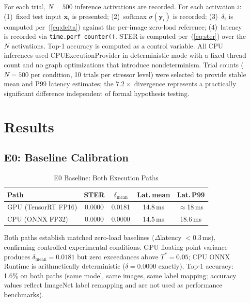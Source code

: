 \documentclass[journal,10pt,twocolumn]{IEEEtran}
\begin{document}
For each trial, $N = 500$ inference activations are recorded.
For each activation $i$: (1)~fixed test input $\mathbf{x}_i$ is
presented; (2)~softmax $\sigma(\mathbf{y}_i)$ is recorded;
(3)~$\delta_i$ is computed per~(\ref{eq:delta}) against the per-image
zero-load reference; (4)~latency is recorded via \texttt{time.perf\_counter()}.
STER is computed per~(\ref{eq:ster}) over the $N$ activations.
Top-1 accuracy is computed as a control variable.
All CPU inferences used CPUExecutionProvider in deterministic mode
with a fixed thread count and no graph optimizations that introduce
nondeterminism.
Trial counts ($N{=}500$ per condition, 10 trials per stressor level)
were selected to provide stable mean and P99 latency estimates; the
$7.2{\times}$ divergence represents a practically significant difference
independent of formal hypothesis testing.

\section{Results}

\subsection{E0: Baseline Calibration}

\begin{table}[!t]
\caption{E0 Baseline: Both Execution Paths}
\label{tab:e0}
\centering
\small
\begin{tabular}{lcccc}
\toprule
\textbf{Path} & \textbf{STER} & \boldmath$\delta_\text{mean}$ & \textbf{Lat.\,mean} & \textbf{Lat.\,P99} \\
\midrule
GPU (TensorRT FP16) & 0.0000 & 0.0181 & 14.8\,ms & $\approx$18\,ms \\
CPU (ONNX FP32)     & 0.0000 & 0.0000 & 14.5\,ms & 18.6\,ms \\
\bottomrule
\end{tabular}
\end{table}

Both paths establish matched zero-load baselines ($\Delta$latency
${<}0.3$\,ms), confirming controlled experimental conditions.
GPU floating-point variance produces $\delta_\text{mean}{=}0.0181$ but
zero exceedances above $T^*{=}0.05$; CPU ONNX Runtime is
arithmetically deterministic ($\delta{=}0.0000$ exactly).
Top-1 accuracy: 1.6\% on both paths (same model, same images,
same label mapping; accuracy values reflect ImageNet label remapping
and are not used as performance benchmarks).
\end{document}
